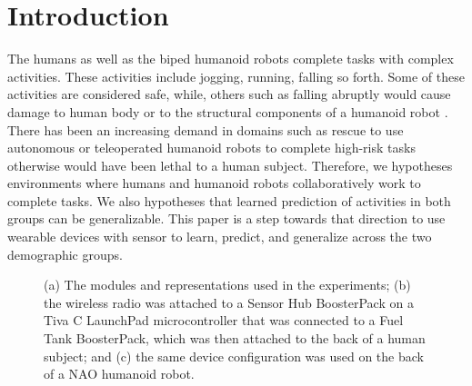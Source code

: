 \documentclass[letterpaper]{article}
\begin{document}
\section{Introduction}

The humans as well as the biped humanoid robots complete tasks with complex activities. These 
activities include jogging, running, falling so forth. Some of these activities are 
considered safe, while, others such as falling abruptly would cause damage to human body 
or to the structural components of a humanoid robot \cite{li2009accurate}. There has been an 
increasing demand in domains such as rescue to use autonomous or teleoperated humanoid robots to 
complete high-risk tasks otherwise would have been lethal to a human subject. Therefore, we 
hypotheses environments where humans and humanoid robots collaboratively work to complete 
tasks. We also hypotheses that learned prediction of activities in both groups can be 
generalizable. This paper is a step towards that direction to use wearable devices with sensor to 
learn, predict, and generalize across the two demographic groups.

\begin{figure}[!t]
\centering
{} 
\caption{(a) The modules and representations used in the experiments;  (b) the wireless radio was 
attached to a Sensor Hub BoosterPack on a Tiva C LaunchPad microcontroller that was connected to a 
Fuel Tank BoosterPack, which was then attached to the back of a human subject; and (c) the same 
device configuration was used on the back of a NAO humanoid robot.}
 \label{fig:framework}
\end{figure}
\end{document}
